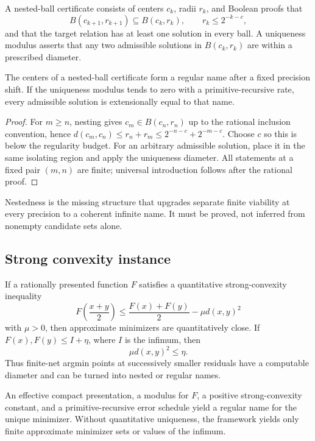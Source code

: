 \begin{definition}
A nested-ball certificate consists of centers $c_k$, radii $r_k$, and Boolean proofs that
\[
  B(c_{k+1},r_{k+1})\subseteq B(c_k,r_k),
  \qquad r_k\le2^{-k-c},
\]
and that the target relation has at least one solution in every ball.  A uniqueness modulus asserts that any two admissible solutions in $B(c_k,r_k)$ are within a prescribed diameter.
\end{definition}

\begin{theorem}
\label{thm:nested-name}
The centers of a nested-ball certificate form a regular name after a fixed precision shift.  If the uniqueness modulus tends to zero with a primitive-recursive rate, every admissible solution is extensionally equal to that name.
\end{theorem}

\begin{proof}
For $m\ge n$, nesting gives $c_m\in B(c_n,r_n)$ up to the rational inclusion convention, hence $d(c_m,c_n)\le r_n+r_m\le2^{-n-c}+2^{-m-c}$.  Choose $c$ so this is below the regularity budget.  For an arbitrary admissible solution, place it in the same isolating region and apply the uniqueness diameter.  All statements at a fixed pair $(m,n)$ are finite; universal introduction follows after the rational proof.
\end{proof}

Nestedness is the missing structure that upgrades separate finite viability at every precision to a coherent infinite name.  It must be proved, not inferred from nonempty candidate sets alone.

\subsection{Strong convexity instance}

If a rationally presented function $F$ satisfies a quantitative strong-convexity inequality
\[
 F\left(\frac{x+y}{2}\right)
 \le\frac{F(x)+F(y)}2-\mu d(x,y)^2
\]
with $\mu>0$, then approximate minimizers are quantitatively close.  If $F(x),F(y)\le I+\eta$, where $I$ is the infimum, then
\[
 \mu d(x,y)^2\le\eta.
\]
Thus finite-net argmin points at successively smaller residuals have a computable diameter and can be turned into nested or regular names.

\begin{corollary}
\label{cor:strong-minimizer}
An effective compact presentation, a modulus for $F$, a positive strong-convexity constant, and a primitive-recursive error schedule yield a regular name for the unique minimizer.  Without quantitative uniqueness, the framework yields only finite approximate minimizer sets or values of the infimum.
\end{corollary}

